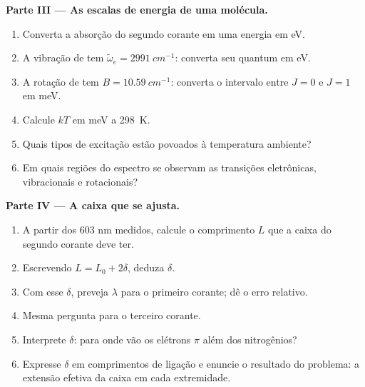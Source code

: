 \begin{problem}
\medskip\noindent\textbf{Parte III --- As escalas de energia de uma molécula.}
\begin{enumerate}[resume]
  \item Converta a absorção do segundo corante em uma energia em eV.
  \item A vibração de  tem $\tilde\omega_e = \qty{2991}{cm^{-1}}$:
        converta seu quantum em eV.
  \item A rotação de  tem $B = \qty{10.59}{cm^{-1}}$: converta o
        intervalo entre $J = 0$ e $J = 1$ em meV.
  \item Calcule $kT$ em meV a \qty{298}{K}.
  \item Quais tipos de excitação estão povoados à temperatura ambiente?
  \item Em quais regiões do espectro se observam as transições eletrônicas,
        vibracionais e rotacionais?
\end{enumerate}

\medskip\noindent\textbf{Parte IV --- A caixa que se ajusta.}
\begin{enumerate}[resume]
  \item A partir dos 603 nm medidos, calcule o comprimento $L$ que a caixa do
        segundo corante deve ter.
  \item Escrevendo $L = L_0 + 2\delta$, deduza $\delta$.
  \item Com esse $\delta$, preveja $\lambda$ para o primeiro corante; dê o
        erro relativo.
  \item Mesma pergunta para o terceiro corante.
  \item Interprete $\delta$: para onde vão os elétrons $\pi$ além dos
        nitrogênios?
  \item Expresse $\delta$ em comprimentos de ligação e enuncie o resultado do
        problema: a extensão efetiva da caixa em cada extremidade.
\end{enumerate}
\end{problem}

